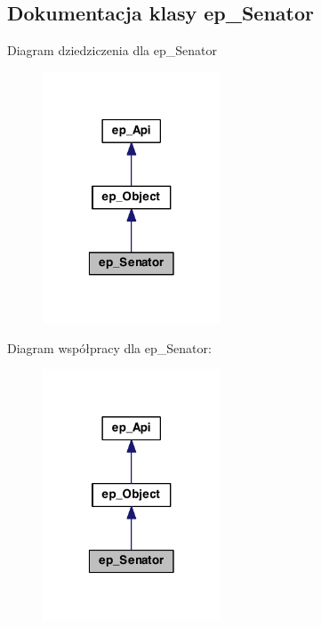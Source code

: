 \hypertarget{classep___senator}{\subsection{Dokumentacja klasy ep\-\_\-\-Senator}
\label{classep___senator}
}


Diagram dziedziczenia dla ep\-\_\-\-Senator\nopagebreak
\begin{figure}[H]
\begin{center}
\leavevmode
\includegraphics[width=150pt]{classep___senator__inherit__graph}
\end{center}
\end{figure}


Diagram współpracy dla ep\-\_\-\-Senator\-:\nopagebreak
\begin{figure}[H]
\begin{center}
\leavevmode
\includegraphics[width=150pt]{classep___senator__coll__graph}
\end{center}
\end{figure}
